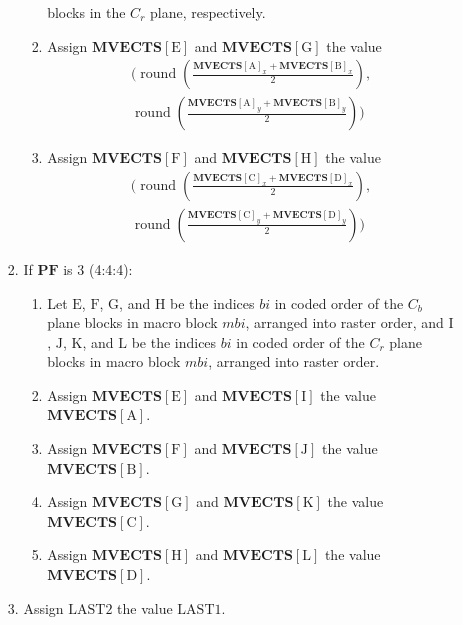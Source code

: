\documentclass[9pt,letterpaper]{book}
\newcommand{\idx}[1]{{\ensuremath{\mathit{#1}}}}
\newcommand{\bi}{\idx{bi}}
\newcommand{\mbi}{\idx{mbi}}
\newcommand{\bitvar}[1]{\ensuremath{\mathbf{\bm{#1}}}}
\newcommand{\locvar}[1]{\ensuremath{\mathrm{#1}}}
\newcommand{\round}{\ensuremath{\mathop{\mathrm{round}}\nolimits}}
\numberwithin{equation}{chapter}
\numberwithin{figure}{chapter}
\numberwithin{table}{chapter}
\begin{document}
\begin{enumerate}
\begin{enumerate}
\begin{enumerate}
\begin{enumerate}
 blocks in the $C_r$ plane, respectively. %
\item
Assign $\bitvar{MVECTS}[\locvar{E}]$ and $\bitvar{MVECTS}[\locvar{G}]$ the
 value
\begin{multline*}
(\round\left(\frac{
 \bitvar{MVECTS}[\locvar{A}]_x+\bitvar{MVECTS}[\locvar{B}]_x}{2}\right), \\
 \round\left(\frac{
 \bitvar{MVECTS}[\locvar{A}]_y+\bitvar{MVECTS}[\locvar{B}]_y}{2}\right))
\end{multline*}
\item
Assign $\bitvar{MVECTS}[\locvar{F}]$ and $\bitvar{MVECTS}[\locvar{H}]$ the
 value
\begin{multline*}
(\round\left(\frac{
 \bitvar{MVECTS}[\locvar{C}]_x+\bitvar{MVECTS}[\locvar{D}]_x}{2}\right), \\
 \round\left(\frac{
 \bitvar{MVECTS}[\locvar{C}]_y+\bitvar{MVECTS}[\locvar{D}]_y}{2}\right))
\end{multline*}
\end{enumerate}
\item
If \bitvar{PF} is 3 (4:4:4):
\begin{enumerate}
\item
Let \locvar{E}, \locvar{F}, \locvar{G}, and \locvar{H} be the indices
 \locvar{\bi} in coded order of the $C_b$ plane blocks in macro block
 \locvar{\mbi}, arranged into raster order, and \locvar{I}, \locvar{J},
 \locvar{K}, and \locvar{L} be the indices \locvar{\bi} in coded order of the
 $C_r$ plane blocks in macro block \locvar{\mbi}, arranged into raster order.
\item
Assign $\bitvar{MVECTS}[\locvar{E}]$ and $\bitvar{MVECTS}[\locvar{I}]$ the
 value \\ $\bitvar{MVECTS}[\locvar{A}]$.
\item
Assign $\bitvar{MVECTS}[\locvar{F}]$ and $\bitvar{MVECTS}[\locvar{J}]$ the
 value \\ $\bitvar{MVECTS}[\locvar{B}]$.
\item
Assign $\bitvar{MVECTS}[\locvar{G}]$ and $\bitvar{MVECTS}[\locvar{K}]$ the
 value \\ $\bitvar{MVECTS}[\locvar{C}]$.
\item
Assign $\bitvar{MVECTS}[\locvar{H}]$ and $\bitvar{MVECTS}[\locvar{L}]$ the
 value \\ $\bitvar{MVECTS}[\locvar{D}]$.
\end{enumerate}
\item
Assign \locvar{LAST2} the value \locvar{LAST1}.

\end{enumerate}
\end{enumerate}
\end{enumerate}
\end{document}
